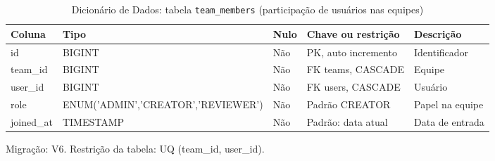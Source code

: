 \begin{table}[H]
\centering
\footnotesize
\caption{Dicionário de Dados: tabela \texttt{team\_\allowbreak{}members} (participação de usuários nas equipes)}
\label{tab:dd-team-members}
\begin{tabular}{|>{\raggedright\arraybackslash}p{3.0cm}|>{\raggedright\arraybackslash}p{3.2cm}|>{\centering\arraybackslash}p{0.8cm}|>{\raggedright\arraybackslash}p{3.0cm}|>{\raggedright\arraybackslash}p{3.8cm}|}
\hline
\textbf{Coluna} & \textbf{Tipo} & \textbf{Nulo} & \textbf{Chave ou restrição} & \textbf{Descrição} \\
\hline
id & BIGINT & Não & PK, auto incremento & Identificador \\
\hline
team\_\allowbreak{}id & BIGINT & Não & FK teams, CASCADE & Equipe \\
\hline
user\_\allowbreak{}id & BIGINT & Não & FK users, CASCADE & Usuário \\
\hline
role & ENUM('ADMIN',\allowbreak 'CREATOR',\allowbreak 'REVIEWER') & Não & Padrão CREATOR & Papel na equipe \\
\hline
joined\_\allowbreak{}at & TIMESTAMP & Não & Padrão: data atual & Data de entrada \\
\hline
\end{tabular}
\par\footnotesize Migração: V6. Restrição da tabela: UQ (team\_\allowbreak{}id, user\_\allowbreak{}id).
\end{table}

